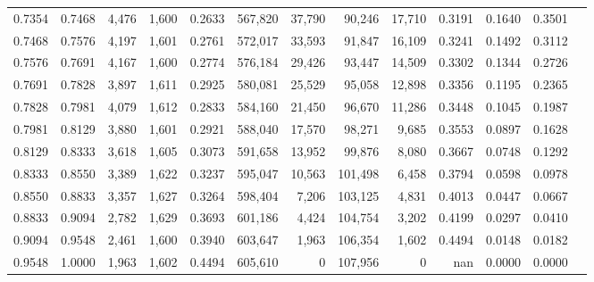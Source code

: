 \begin{tabular}{rrrrrrrrrrrrr}
0.7354 & 0.7468 &  4,476 & 1,600 &                                     0.2633 & 567,820 &  37,790 &  90,246 &  17,710 & 0.3191 & 0.1640 & 0.3501 \\
0.7468 & 0.7576 &  4,197 & 1,601 &                                     0.2761 & 572,017 &  33,593 &  91,847 &  16,109 & 0.3241 & 0.1492 & 0.3112 \\
0.7576 & 0.7691 &  4,167 & 1,600 &                                     0.2774 & 576,184 &  29,426 &  93,447 &  14,509 & 0.3302 & 0.1344 & 0.2726 \\
0.7691 & 0.7828 &  3,897 & 1,611 &                                     0.2925 & 580,081 &  25,529 &  95,058 &  12,898 & 0.3356 & 0.1195 & 0.2365 \\
0.7828 & 0.7981 &  4,079 & 1,612 &                                     0.2833 & 584,160 &  21,450 &  96,670 &  11,286 & 0.3448 & 0.1045 & 0.1987 \\
0.7981 & 0.8129 &  3,880 & 1,601 &                                     0.2921 & 588,040 &  17,570 &  98,271 &   9,685 & 0.3553 & 0.0897 & 0.1628 \\
0.8129 & 0.8333 &  3,618 & 1,605 &                                     0.3073 & 591,658 &  13,952 &  99,876 &   8,080 & 0.3667 & 0.0748 & 0.1292 \\
0.8333 & 0.8550 &  3,389 & 1,622 &                                     0.3237 & 595,047 &  10,563 & 101,498 &   6,458 & 0.3794 & 0.0598 & 0.0978 \\
0.8550 & 0.8833 &  3,357 & 1,627 &                                     0.3264 & 598,404 &   7,206 & 103,125 &   4,831 & 0.4013 & 0.0447 & 0.0667 \\
0.8833 & 0.9094 &  2,782 & 1,629 &                                     0.3693 & 601,186 &   4,424 & 104,754 &   3,202 & 0.4199 & 0.0297 & 0.0410 \\
0.9094 & 0.9548 &  2,461 & 1,600 &                                     0.3940 & 603,647 &   1,963 & 106,354 &   1,602 & 0.4494 & 0.0148 & 0.0182 \\
0.9548 & 1.0000 &  1,963 & 1,602 &                                     0.4494 & 605,610 &       0 & 107,956 &       0 &    nan & 0.0000 & 0.0000 \\
\bottomrule
\end{tabular}
